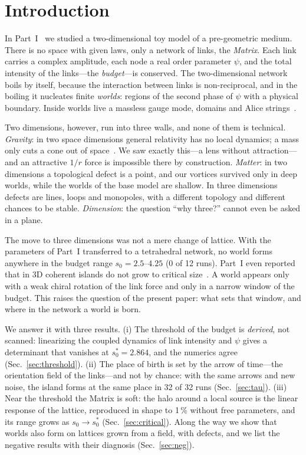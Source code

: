 \documentclass[reprint,pre,amsmath,amssymb,superscriptaddress,nofootinbib]{revtex4-2}
\newcommand{\sz}{s_0}
\newcommand{\szc}{s_0^{*}}
\begin{document}
\section{Introduction}\label{sec:intro}


In Part~I~\cite{Batrukh2026v1} we studied a two-dimensional toy model of a pre-geometric medium. There is no space with given laws, only a network of links, the \emph{Matrix}. Each link carries a complex amplitude, each node a real order parameter $\psi$, and the total intensity of the links---the \emph{budget}---is conserved. The two-dimensional network boils by itself, because the interaction between links is non-reciprocal, and in the boiling it nucleates finite \emph{worlds}: regions of the second phase of $\psi$ with a physical boundary. Inside worlds live a massless gauge mode, domains and Alice strings~\cite{Batrukh2026v1,Batrukh2026alice}.

Two dimensions, however, run into three walls, and none of them is technical. \emph{Gravity}: in two space dimensions general relativity has no local dynamics; a mass only cuts a cone out of space~\cite{Deser1984}. We saw exactly this---a lens without attraction---and an attractive $1/r$ force is impossible there by construction. \emph{Matter}: in two dimensions a topological defect is a point, and our vortices survived only in deep worlds, while the worlds of the base model are shallow. In three dimensions defects are lines, loops and monopoles, with a different topology and different chances to be stable. \emph{Dimension}: the question ``why three?'' cannot even be asked in a plane.

The move to three dimensions was not a mere change of lattice. With the parameters of Part~I transferred to a tetrahedral network, no world forms anywhere in the budget range $\sz=2.5$--$4.25$ (0 of 12 runs). Part~I even reported that in 3D coherent islands do not grow to critical size~\cite{Batrukh2026v1}. A world appears only with a weak chiral rotation of the link force and only in a narrow window of the budget. This raises the question of the present paper: what sets that window, and where in the network a world is born.

We answer it with three results.
(i) The threshold of the budget is \emph{derived}, not scanned: linearizing the coupled dynamics of link intensity and $\psi$ gives a determinant that vanishes at $\szc=2.864$, and the numerics agree (Sec.~\ref{sec:threshold}).
(ii) The place of birth is set by the arrow of time---the orientation field of the links---and not by chance: with the same arrows and new noise, the island forms at the same place in 32 of 32 runs (Sec.~\ref{sec:tau}).
(iii) Near the threshold the Matrix is soft: the halo around a local source is the linear response of the lattice, reproduced in shape to 1\,\% without free parameters, and its range grows as $\sz\to\szc$ (Sec.~\ref{sec:critical}).
Along the way we show that worlds also form on lattices grown from a field, with defects, and we list the negative results with their diagnosis (Sec.~\ref{sec:neg}).
\end{document}
